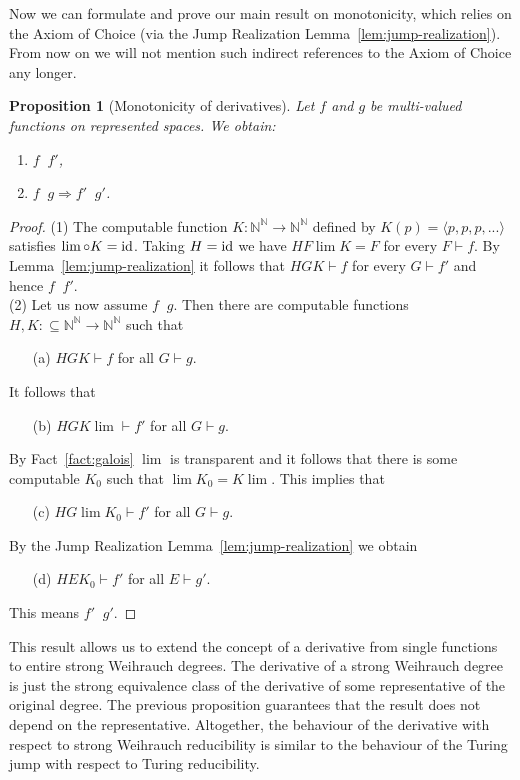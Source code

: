 \documentclass[a4paper]{amsart}
\def\IN{{\mathbb{N}}}
\def\TO{\Longrightarrow}
\def\In{\subseteq}
\def\id{{\rm id}}
\def\Baire{{\IN^\IN}}
\def\leqSW{\mathop{\leq_{\mathrm{sW}}}}
\newtheorem{proposition}[theorem]{Proposition}
\theoremstyle{definition}
\begin{document}
Now we can formulate and prove our main result on monotonicity, which relies on the
Axiom of Choice (via the Jump Realization Lemma~\ref{lem:jump-realization}).
From now on we will not mention such indirect references to the Axiom of Choice any longer.

\begin{proposition}[Monotonicity of derivatives]
\label{prop:monotone-derivative}
Let $f$ and $g$ be multi-valued functions on represented spaces. We obtain:
\begin{enumerate}
\item $f\leqSW f'$,
\item $f\leqSW g\TO f'\leqSW g'$.
\end{enumerate}
\end{proposition}
\begin{proof}
(1) The computable function $K:\Baire\to\Baire$ defined by $K(p)=\langle p,p,p,...\rangle$ satisfies
$\lim\circ K=\id$. Taking $H=\id$ we have $HF\lim K=F$ for every $F\vdash f$.
By Lemma~\ref{lem:jump-realization} it follows that $HGK\vdash f$ for every $G\vdash f'$ and hence $f\leqSW f'$.\\
(2) 
Let us now assume $f\leqSW g$. Then there are computable functions $H,K:\In\Baire\to\Baire$ 
such that 
\begin{enumerate}
\item[(a)] $HGK\vdash f$ for all $G\vdash g$. 
\end{enumerate}
It follows that 
\begin{enumerate}
\item[(b)] $HGK\lim\vdash f'$ for all $G\vdash g$.
\end{enumerate}
By Fact~\ref{fact:galois} $\lim$ is transparent and it follows that there
is some computable $K_0$ such that $\lim K_0=K\lim$. This implies that
\begin{enumerate}
\item[(c)] $HG\lim K_0\vdash f'$ for all $G\vdash g$.
\end{enumerate}
By the Jump Realization Lemma~\ref{lem:jump-realization} we obtain
\begin{enumerate}
\item[(d)] $HEK_0\vdash f'$ for all $E\vdash g'$. 
\end{enumerate}
This means $f'\leqSW g'$.
\end{proof}

This result allows us to extend the concept of a derivative from single functions to 
entire strong Weihrauch degrees. The derivative of a strong Weihrauch degree is just
the strong equivalence class of the derivative of some representative of the original degree.
The previous proposition guarantees that the result does not depend on the representative.
Altogether, the behaviour of the derivative with respect to strong Weihrauch reducibility
is similar to the behaviour of the Turing jump with respect to Turing reducibility.
\end{document}
